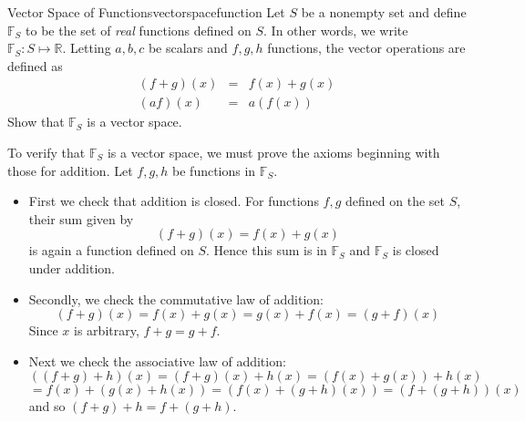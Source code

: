 \begin{example}{Vector Space of Functions}{vectorspacefunction}
Let $S$ be a nonempty set and define $\mathbb{F}_S$ to be the set of \textit{real} functions
defined on $S$. In other words, we write $\mathbb{F}_S: S \mapsto \mathbb{R}$. Letting $a,b,c$ be scalars and $f,g,h$ functions, the
vector operations are defined as
\begin{eqnarray*}
\left( f+g\right) \left( x\right)  &=&f\left( x\right) +g\left(
x\right)  \\
\left( af\right) \left( x\right)  &=&a\left( f\left( x\right) \right)
\end{eqnarray*}
Show that $\mathbb{F}_S$ is a vector space. 
\end{example}

\begin{solution}
To verify that $\mathbb{F}_S$ is a vector space, we must prove the axioms beginning with those for addition. Let $f, g, h$ be functions in $\mathbb{F}_S$. 

\begin{itemize}
\item
First we check that addition is closed.  For functions $f, g$ defined on the set $S$, their sum given by 
\[
(f+g)(x) = f(x)+g(x)
\]
is again a function defined on $S$. Hence this sum is in $\mathbb{F}_S$ and $\mathbb{F}_S$ is closed under addition. 

\item
Secondly, we check the commutative law of addition:
\begin{equation*}
\left( f+g\right) \left( x\right) =f\left( x\right) +g\left( x\right)
=g\left( x\right) +f\left( x\right) =\left( g+f\right) \left( x\right)
\end{equation*}
Since $x$ is arbitrary, $f+g=g+f$.

\item
Next we check the associative law of addition:
\begin{equation*}
\left( \left( f+g\right) +h\right) \left( x\right) = \left( f+g\right)
\left( x\right) +h\left( x\right) =\left( f\left( x\right) +g\left( x\right)
\right) +h\left( x\right)
\end{equation*}
\begin{equation*}
=f\left( x\right) +\left( g\left( x\right) +h\left( x\right) \right) =\left(
f\left( x\right) +\left( g+h\right) \left( x\right) \right) =\left( f+\left(
g+h\right) \right) \left( x\right)
\end{equation*}
and so $\left( f+g\right) +h=f+\left( g+h\right) .$


\end{itemize}
\end{solution}
